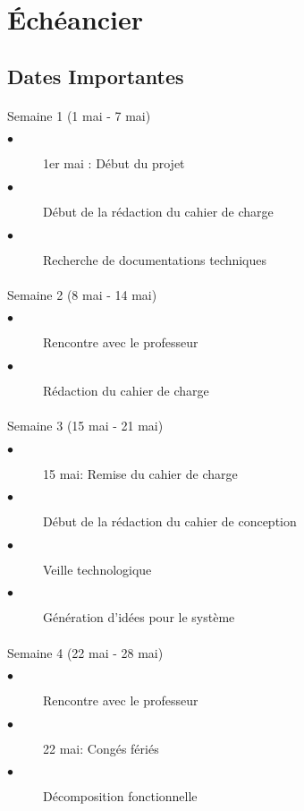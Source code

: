 \section{Échéancier}

	\subsection{Dates Importantes}
	
		\paragraph{}
		Semaine 1 (1 mai - 7 mai)
			\begin{description}
				\item[$\bullet$] 1er mai : Début du projet
				\item[$\bullet$] Début de la rédaction du cahier de charge
				\item[$\bullet$] Recherche de documentations techniques
			\end{description}
	
		\paragraph{}
		Semaine 2 (8 mai - 14 mai)
			\begin{description}
				\item[$\bullet$] Rencontre avec le professeur
				\item[$\bullet$] Rédaction du cahier de charge
			\end{description}
		
		\paragraph{}
		Semaine 3 (15 mai - 21 mai)
			\begin{description}
				\item[$\bullet$] 15 mai: Remise du cahier de charge
				\item[$\bullet$] Début de la rédaction du cahier de conception
				\item[$\bullet$] Veille technologique
				\item[$\bullet$] Génération d'idées pour le système					
			\end{description}
		
		\paragraph{}
		Semaine 4 (22 mai - 28 mai)
			\begin{description}
				\item[$\bullet$] Rencontre avec le professeur
				\item[$\bullet$] 22 mai: Congés fériés				
				\item[$\bullet$] Décomposition fonctionnelle
				
			\end{description}
		
